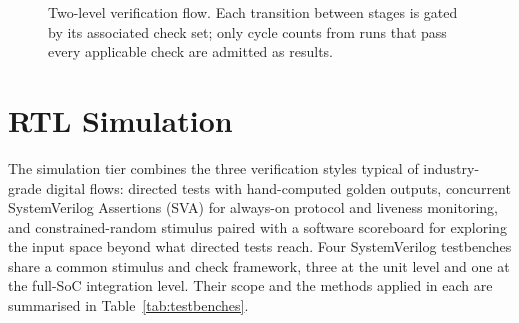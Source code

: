 \begin{figure}[htbp]
  \centering
  \caption{Two-level verification flow. Each transition between stages
           is gated by its associated check set; only cycle counts from
           runs that pass every applicable check are admitted as
           results.}
  \label{fig:verification-flow}
\end{figure}

\section{RTL Simulation}

The simulation tier combines the three verification styles typical of
industry-grade digital flows: directed tests with hand-computed golden
outputs, concurrent SystemVerilog Assertions (SVA) for always-on
protocol and liveness monitoring, and constrained-random stimulus
paired with a software scoreboard for exploring the input space beyond
what directed tests reach. Four SystemVerilog testbenches share a common
stimulus and check framework, three at the unit level and one at the
full-SoC integration level. Their scope and the methods applied in each
are summarised in Table~\ref{tab:testbenches}.

